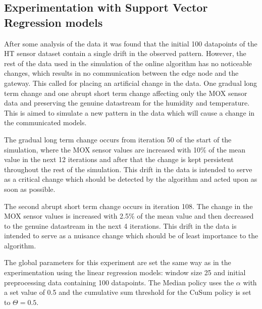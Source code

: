 \documentclass{mpaper}
\begin{document}
\subsection{Experimentation with Support Vector Regression models}

After some analysis of the data it was found that the initial 100 datapoints of the HT sensor dataset contain a single drift in the observed pattern. However, the rest of the data used in the simulation of the online algorithm has no noticeable changes, which results in no communication between the edge node and the gateway. This called for placing an artificial change in the data. One gradual long term change and one abrupt short term change affecting only the MOX sensor data and preserving the genuine datastream for the humidity and temperature. This is aimed to simulate a new pattern in the data which will cause a change in the communicated models.

The gradual long term change occurs from iteration 50 of the start of the simulation, where the MOX sensor values are increased with 10\% of the mean value in the next 12 iterations and after that the change is kept persistent throughout the rest of the simulation. This drift in the data is intended to serve as a critical change \cite{lautay2018} which should be detected by the algorithm and acted upon as soon as possible.

The second abrupt short term change occurs in iteration 108. The change in the MOX sensor values is increased with 2.5\% of the mean value and then decreased to the genuine datastream in the next 4 iterations. This drift in the data is intended to serve as a nuisance change \cite{lautay2018} which should be of least importance to the algorithm.

The global parameters for this experiment are set the same way as in the experimentation using the linear regression models: window size 25 and initial preprocessing data containing 100 datapoints. 
The Median policy uses the $\alpha$ with a set value of 0.5 and the cumulative sum threshold for the CuSum policy is set to $\Theta=0.5$.
\end{document}
